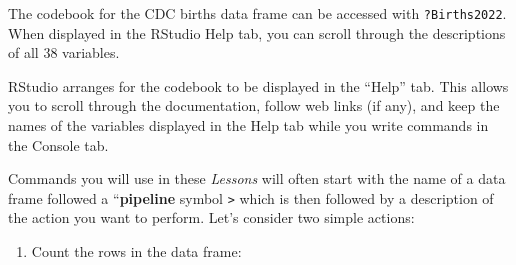 \documentclass[
  letterpaper,
  DIV=11,
  numbers=noendperiod,
  oneside]{scrartcl}
\providecommand{\tightlist}{%
  \setlength{\itemsep}{0pt}\setlength{\parskip}{0pt}}\usepackage{longtable,booktabs,array}
\begin{document}
\begin{marginfigure}


\caption{\label{fig-cdc-codebook}The codebook for the CDC births data
frame can be accessed with \texttt{?Births2022}. When displayed in the
RStudio Help tab, you can scroll through the descriptions of all 38
variables.}

\end{marginfigure}%

RStudio arranges for the codebook to be displayed in the ``Help'' tab.
This allows you to scroll through the documentation, follow web links
(if any), and keep the names of the variables displayed in the Help tab
while you write commands in the Console tab.

Commands you will use in these \emph{Lessons} will often start with the
name of a data frame followed a ``\textbf{pipeline} symbol
\texttt{\textbar{}\textgreater{}} which is then followed by a
description of the action you want to perform. Let's consider two simple
actions:

\begin{enumerate}
\def\labelenumi{\arabic{enumi}.}
\tightlist
\item
  Count the rows in the data frame:
\end{enumerate}
\end{document}
